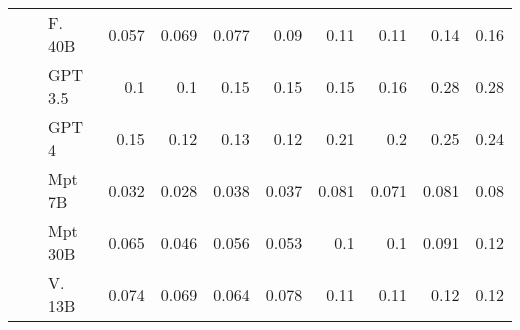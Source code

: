 \begin{table}[!htbp]
\begin{tabular}{l|l|l|rrrr|rrrr}
 &  & F. 40B & {\cellcolor[HTML]{BCD7EB}} \color[HTML]{000000} 0.057 & {\cellcolor[HTML]{A1CBE2}} \color[HTML]{000000} 0.069 & {\cellcolor[HTML]{8CC0DD}} \color[HTML]{000000} 0.077 & {\cellcolor[HTML]{68ACD5}} \color[HTML]{F1F1F1} 0.09    & {\cellcolor[HTML]{FCAB8F}} \color[HTML]{000000} 0.11 & {\cellcolor[HTML]{FCA285}} \color[HTML]{000000} 0.11 & {\cellcolor[HTML]{FB7D5D}} \color[HTML]{F1F1F1} 0.14 & {\cellcolor[HTML]{FA6648}} \color[HTML]{F1F1F1} 0.16 \\
 &  & GPT 3.5  & {\cellcolor[HTML]{4B98CA}} \color[HTML]{F1F1F1} 0.1 & {\cellcolor[HTML]{4997C9}} \color[HTML]{F1F1F1} 0.1 & {\cellcolor[HTML]{084285}} \color[HTML]{F1F1F1} 0.15 & {\cellcolor[HTML]{084F99}} \color[HTML]{F1F1F1} 0.15    & {\cellcolor[HTML]{FB7B5B}} \color[HTML]{F1F1F1} 0.15 & {\cellcolor[HTML]{FA6547}} \color[HTML]{F1F1F1} 0.16 & {\cellcolor[HTML]{79040F}} \color[HTML]{F1F1F1} 0.28 & {\cellcolor[HTML]{6F020E}} \color[HTML]{F1F1F1} 0.28 \\
 &  & GPT 4   & {\cellcolor[HTML]{084285}} \color[HTML]{F1F1F1} 0.15 & {\cellcolor[HTML]{2B7BBA}} \color[HTML]{F1F1F1} 0.12 & {\cellcolor[HTML]{206FB4}} \color[HTML]{F1F1F1} 0.13 & {\cellcolor[HTML]{2F7FBC}} \color[HTML]{F1F1F1} 0.12    & {\cellcolor[HTML]{D82422}} \color[HTML]{F1F1F1} 0.21 & {\cellcolor[HTML]{E43027}} \color[HTML]{F1F1F1} 0.2 & {\cellcolor[HTML]{AB1016}} \color[HTML]{F1F1F1} 0.25 & {\cellcolor[HTML]{BB141A}} \color[HTML]{F1F1F1} 0.24 \\
 &  & Mpt 7B  & {\cellcolor[HTML]{DFECF7}} \color[HTML]{000000} 0.032 & {\cellcolor[HTML]{E5EFF9}} \color[HTML]{000000} 0.028 & {\cellcolor[HTML]{D7E6F5}} \color[HTML]{000000} 0.038 & {\cellcolor[HTML]{D9E8F5}} \color[HTML]{000000} 0.037    & {\cellcolor[HTML]{FDCCB8}} \color[HTML]{000000} 0.081 & {\cellcolor[HTML]{FDD7C6}} \color[HTML]{000000} 0.071 & {\cellcolor[HTML]{FDCBB6}} \color[HTML]{000000} 0.081 & {\cellcolor[HTML]{FDCCB8}} \color[HTML]{000000} 0.08 \\
 &  & Mpt 30B    & {\cellcolor[HTML]{AACFE5}} \color[HTML]{000000} 0.065 & {\cellcolor[HTML]{CDE0F1}} \color[HTML]{000000} 0.046 & {\cellcolor[HTML]{BED8EC}} \color[HTML]{000000} 0.056 & {\cellcolor[HTML]{C3DAEE}} \color[HTML]{000000} 0.053    & {\cellcolor[HTML]{FCB69B}} \color[HTML]{000000} 0.1 & {\cellcolor[HTML]{FCB69B}} \color[HTML]{000000} 0.1 & {\cellcolor[HTML]{FCC1A8}} \color[HTML]{000000} 0.091 & {\cellcolor[HTML]{FCA082}} \color[HTML]{000000} 0.12 \\
 &  & V. 13B  & {\cellcolor[HTML]{94C4DF}} \color[HTML]{000000} 0.074 & {\cellcolor[HTML]{A3CCE3}} \color[HTML]{000000} 0.069 & {\cellcolor[HTML]{ABD0E6}} \color[HTML]{000000} 0.064 & {\cellcolor[HTML]{8ABFDD}} \color[HTML]{000000} 0.078    & {\cellcolor[HTML]{FCA486}} \color[HTML]{000000} 0.11 & {\cellcolor[HTML]{FCA689}} \color[HTML]{000000} 0.11 & {\cellcolor[HTML]{FC997A}} \color[HTML]{000000} 0.12 & {\cellcolor[HTML]{FCA183}} \color[HTML]{000000} 0.12 \\

\end{tabular}
\end{table}
